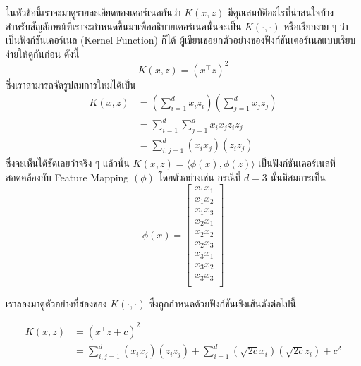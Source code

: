 ในหัวข้อนี้เราจะมาดูรายละเอียดของเคอร์เนลกันว่า $K(x,z)$ มีคุณสมบัติอะไรที่น่าสนใจบ้าง สำหรับสัญลักษณ์ที่เราจะกำหนดขึ้นมาเพื่ออธิบายเคอร์เนลนั้นจะเป็น $K(\cdot,\cdot)$ หรือเรียกง่าย ๆ ว่าเป็นฟังก์ชันเคอร์เนล (Kernel Function) ก็ได้ ผู้เขียนขอยกตัวอย่างของฟังก์ชันเคอร์เนลแบบเรียบง่ายให้ดูกันก่อน ดังนี้
%
\begin{equation}
    K(x,z) = (x^{\top} z)^{2}
\end{equation}
%
\noindent ซึ่งเราสามารถจัดรูปสมการใหม่ได้เป็น
%
\begin{align}
    K(x,z) & = \left( \sum_{i=1}^d x_i z_i \right) \left( \sum_{j=1}^d x_j z_j \right) \\
           & = \sum_{i=1}^d \sum_{j=1}^d x_i x_j z_i z_j                               \\
           & = \sum_{i,j=1}^d (x_i x_j)(z_i z_j)
\end{align}
%
\noindent ซึ่งจะเห็นได้ชัดเลยว่าจริง ๆ แล้วนั้น $K(x,z) = \langle\phi(x),\phi(z)\rangle$ เป็นฟังก์ชันเคอร์เนลที่สอดคล้องกับ Feature
Mapping $(\phi)$ โดยตัวอย่างเช่น กรณีที่ $d = 3$ นั้นมีสมการเป็น
%
\begin{equation}\label{eq:feature_map_ex1}
    \phi(x) =
    \begin{bmatrix}
        x_1 x_1 \\
        x_1 x_2 \\
        x_1 x_3 \\
        x_2 x_1 \\
        x_2 x_2 \\
        x_2 x_3 \\
        x_3 x_1 \\
        x_3 x_2 \\
        x_3 x_3 \\
    \end{bmatrix}
\end{equation}

เราลองมาดูตัวอย่างที่สองของ $K(\cdot,\cdot)$ ซึ่งถูกกำหนดด้วยฟังก์ชันเชิงเส้นดังต่อไปนี้

\begin{align}
    K(x,z) & = (x^{\top} z + c)^2 \\
           & = \sum_{i,j=1}^d (x_i x_j)(z_i z_j) + \sum_{i=1}^d \left(\sqrt{2c}x_i\right) \left(\sqrt{2c}z_i\right)
    + c^2
\end{align}

